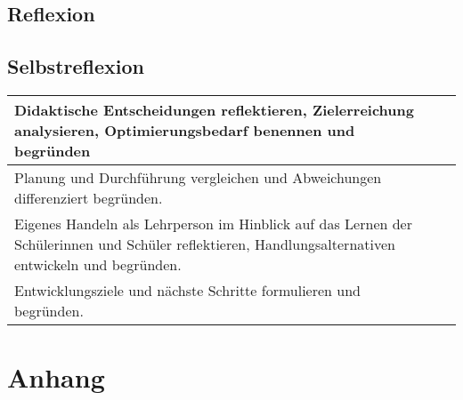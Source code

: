 \documentclass[
11pt,
captions=tableheading,
headsepline,
footsepline, 
captions=tableheading,
parskip=half-,
]{scrartcl}
\begin{document}
\begin{landscape}
    
    \section{Reflexion}
    \subsection{Selbstreflexion}
    \begin{table}[H]
        \centering
        \label{tab:Relexion}
        \begin{longtable}{@{}p{10cm}|p{13cm}@{}}
            \toprule
            Didaktische Entscheidungen reflektieren, Zielerreichung analysieren, Optimierungsbedarf benennen und begründen & {} \\
            \midrule
            Planung und Durchführung vergleichen und Abweichungen differenziert begründen. & {} \\
            \midrule
            Eigenes Handeln als Lehrperson im Hinblick auf das Lernen der Schülerinnen und Schüler reflektieren, Handlungsalternativen entwickeln und begründen. & {} \\
            \midrule
            Entwicklungsziele und nächste Schritte formulieren und begründen.   & {} \\
            \bottomrule
        \end{longtable}
    \end{table}
\end{landscape}
    





\clearpage
{}

\printbibliography
\clearpage
\section*{Anhang}



\end{document}
